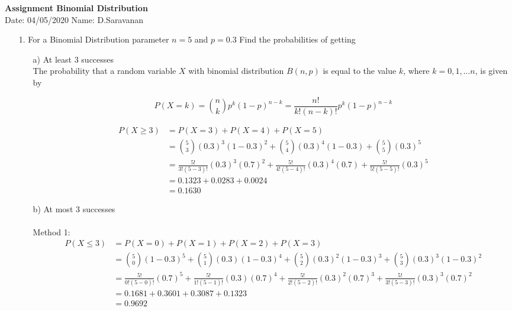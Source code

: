 \documentclass[a4paper,11pt,openright]{report}
\begin{document}
\singlespacing
\pagestyle{plain}

\begin{center}
\textbf{Assignment Binomial Distribution} \\
Date: 04/05/2020 \hspace{2mm} Name: D.Saravanan
\end{center}

\vspace{10px}

\begin{enumerate}

\item[1.] For a Binomial Distribution parameter $n = 5$ and $p = 0.3$ Find the probabilities
of getting

\begin{enumerate}

\item[a)] At least $3$ successes \\
The probability that a random variable $X$  with binomial distribution $B(n,p)$ is equal to
the value $k$, where $k = 0, 1,...n$, is given by

\begin{equation*}
P(X = k) = \binom nk p^{k} (1-p)^{n-k} = \frac{n!}{k! (n-k)!} p^{k} (1-p)^{n-k}
\end{equation*}

\begin{equation*}
\begin{split}
		P(X \geq 3) & = P(X = 3) + P(X = 4) + P(X = 5) \\ 
		& = \binom 53 (0.3)^{3} (1-0.3)^{2} + \binom 54 (0.3)^{4} (1-0.3) + \binom 55 (0.3)^{5} \\ 
		& = \frac{5!}{3! (5-3)!} (0.3)^{3} (0.7)^{2} + \frac{5!}{4! (5-4)!} (0.3)^{4} (0.7) + \frac{5!}{5! (5-5)!} (0.3)^{5} \\
		& = 0.1323 + 0.0283 + 0.0024 \\
		& = 0.1630
\end{split}
\end{equation*}

\item[b)] At most $3$ successes \\ \\
Method 1:
\begin{equation*}
\begin{split}
		P(X \leq 3) & = P(X = 0) + P(X = 1) + P(X = 2) + P(X = 3) \\ 
		& = \binom 50 (1-0.3)^{5} + \binom 51 (0.3) (1-0.3)^{4} + \binom 52 (0.3)^{2} (1-0.3)^{3} + \binom 53 (0.3)^{3} (1-0.3)^{2} \\
		& = \frac{5!}{0! (5-0)!} (0.7)^{5} + \frac{5!}{1! (5-1)!} (0.3) (0.7)^{4} + \frac{5!}{2! (5-2)!} (0.3)^{2} (0.7)^{3} + \frac{5!}{3! (5-3)!} (0.3)^{3} (0.7)^{2} \\
		& = 0.1681 + 0.3601 + 0.3087 + 0.1323 \\
		& = 0.9692
\end{split}
\end{equation*}


\end{enumerate}
\end{enumerate}
\end{document}
